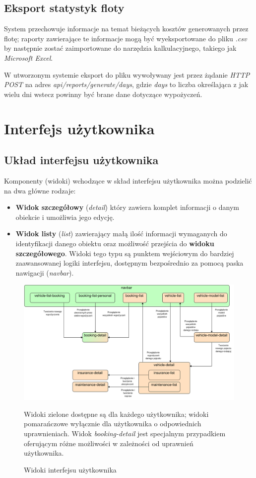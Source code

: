 \documentclass[eng,printmode,openany]{mgr}
\begin{document}
	\newpage
	\subsection{Eksport statystyk floty}
	System przechowuje informacje na temat bieżących kosztów generowanych przez flotę; raporty zawierające te informacje mogą być wyeksportowane do pliku \textit{.csv} by następnie zostać zaimportowane do narzędzia kalkulacyjnego, takiego jak \textit{Microsoft Excel}.
	
	W utworzonym systemie eksport do pliku wywoływany jest przez żądanie \textit{HTTP POST} na adres \textit{api/reports/generate/days}, gdzie \textit{days} to liczba określająca z jak wielu dni wstecz powinny być brane dane dotyczące wypożyczeń.
	
	
	\newpage
	\section{Interfejs użytkownika}
	\subsection{Układ interfejsu użytkownika}
	Komponenty (widoki) wchodzące w skład interfejsu użytkownika można podzielić na dwa główne rodzaje:
	\begin{itemize}
		\item \textbf{Widok szczegółowy} (\textit{detail}) który zawiera komplet informacji o danym obiekcie i umożliwia jego edycję.
		\item \textbf{Widok listy} (\textit{list}) zawierający małą ilość informacji wymaganych do identyfikacji danego obiektu oraz możliwość przejścia do \textbf{widoku szczegółowego}. Widoki tego typu są punktem wejściowym do bardziej zaawansowanej logiki interfejsu, dostępnym bezpośrednio za pomocą paska nawigacji (\textit{navbar}).
	\end{itemize}
	\begin{figure}[h]
		\centering
		\includegraphics[scale=0.62]{images/angular_views.png}
		\caption{Widoki interfejsu użytkownika}
		\small 
		Widoki zielone dostępne są dla każdego użytkownika; widoki pomarańczowe wyłącznie dla użytkownika o odpowiednich uprawnieniach. Widok \textit{booking-detail} jest specjalnym przypadkiem oferującym różne możliwości w zależności od uprawnień użytkownika.
	\end{figure}
	
\end{document}
